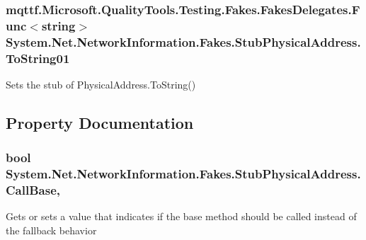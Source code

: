 \hypertarget{class_system_1_1_net_1_1_network_information_1_1_fakes_1_1_stub_physical_address_aa7a39dff545ec59cce38c7dbc9a05e52}{
\subsubsection[{To\-String01}]{\setlength{\rightskip}{0pt plus 5cm}mqttf.\-Microsoft.\-Quality\-Tools.\-Testing.\-Fakes.\-Fakes\-Delegates.\-Func$<$string$>$ System.\-Net.\-Network\-Information.\-Fakes.\-Stub\-Physical\-Address.\-To\-String01}}\label{class_system_1_1_net_1_1_network_information_1_1_fakes_1_1_stub_physical_address_aa7a39dff545ec59cce38c7dbc9a05e52}


Sets the stub of Physical\-Address.\-To\-String()



\subsection{Property Documentation}
\hypertarget{class_system_1_1_net_1_1_network_information_1_1_fakes_1_1_stub_physical_address_a3d219d745a7f90e7236765208b144bc1}{
\subsubsection[{Call\-Base}]{\setlength{\rightskip}{0pt plus 5cm}bool System.\-Net.\-Network\-Information.\-Fakes.\-Stub\-Physical\-Address.\-Call\-Base\hspace{0.3cm}{\ttfamily [get]}, {\ttfamily [set]}}}\label{class_system_1_1_net_1_1_network_information_1_1_fakes_1_1_stub_physical_address_a3d219d745a7f90e7236765208b144bc1}


Gets or sets a value that indicates if the base method should be called instead of the fallback behavior

